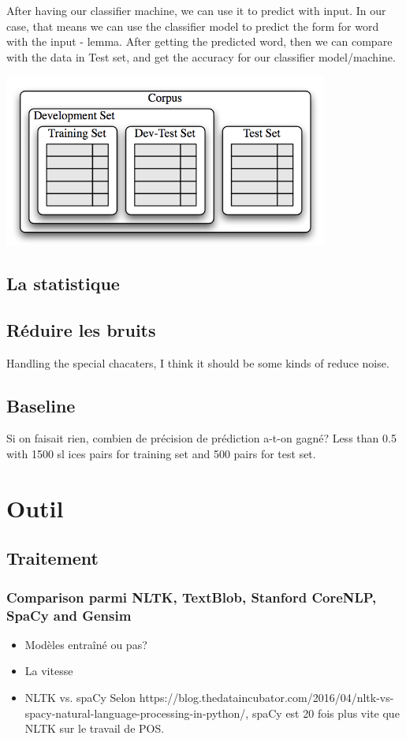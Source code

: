 \documentclass[a4paper]{article}
\begin{document}
After having our classifier machine, we can use it to predict with input. In our case, that means we can use the classifier model to predict the form for word with the input - lemma. After getting the predicted word, then we can compare with the data in Test set, and get the accuracy for our classifier model/machine.

\begin{center}
\includegraphics[width=0.8\textwidth]{Corpus.png}
\end{center}

\subsection{La statistique}

\subsection{Réduire les bruits}
Handling the special chacaters, I think it should be some kinds of reduce noise.
\subsection{Baseline}
Si on faisait rien, combien de précision de prédiction a-t-on gagné? 
Less than 0.5 with 1500 sl	ices pairs for training set and 500 pairs for test set.

\section{Outil}
\subsection{Traitement}
\subsubsection{Comparison parmi NLTK, TextBlob, Stanford CoreNLP, SpaCy and Gensim}
\begin{itemize}
\item Modèles entraîné ou pas?
\item La vitesse
\item NLTK vs. spaCy  Selon https://blog.thedataincubator.com/2016/04/nltk-vs-spacy-natural-language-processing-in-python/, spaCy est 20 fois plus vite que NLTK sur le travail de POS.
\end{itemize}
\end{document}
